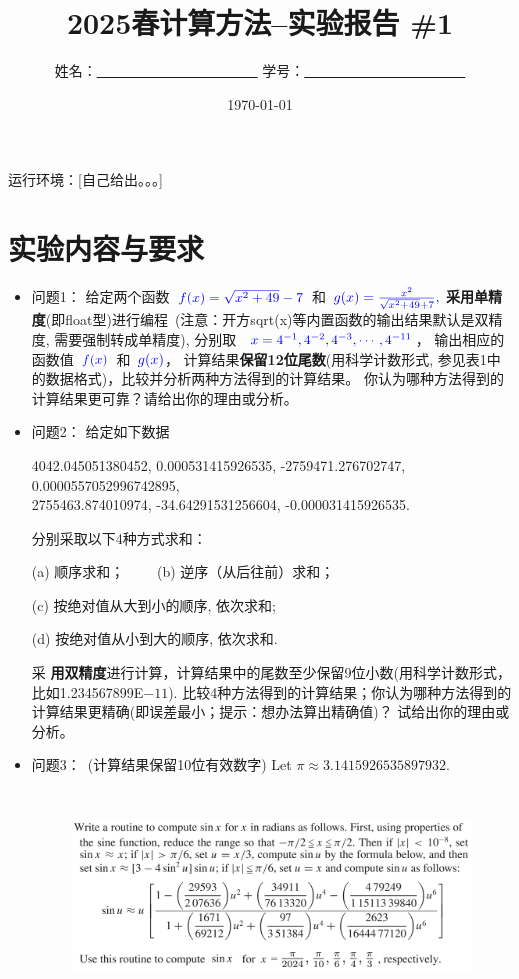 \documentclass[UTF8]{ctexart}
\title{\bf 2025春计算方法--实验报告 \#1}
\author{姓名：\underline{~~~~~~~~~~~~~~~~~~~~~~~}  学号：\underline{~~~~~~~~~~~~~~~~~~~~~~~} }
\date{\today}
\begin{document}
\maketitle

运行环境：[自己给出。。。]

\section*{实验内容与要求}
\begin{itemize}
  \item{问题1：}
  给定两个函数~$\color{blue}f(x)=\sqrt{x^2+49}-7$~和~$\color{blue}g(x)=\frac{x^2}{\sqrt{x^2+49}+7},$
{\bf\color{red} 采用单精度}(即float型)进行编程~(注意：开方sqrt(x)等内置函数的输出结果默认是双精度,
需要强制转成单精度), 分别取
~$\color{blue}x=4^{-1}, 4^{-2}, 4^{-3}, \cdots, 4^{-11}$，
输出相应的函数值~$\color{blue}f(x)$~和~$\color{blue}g(x)$，
计算结果{\bf 保留12位尾数}(用科学计数形式, 参见表1中的数据格式)，比较并分析两种方法得到的计算结果。
你认为哪种方法得到的计算结果更可靠？请给出你的理由或分析。

  \item{问题2：} 给定如下数据


4042.045051380452, 0.000531415926535, -2759471.276702747, 0.0000557052996742895, \\
2755463.874010974, -34.64291531256604,  -0.000031415926535.

分别采取以下4种方式求和：

(a) 顺序求和； ~~~~(b) 逆序（从后往前）求和；

(c) 按绝对值从大到小的顺序, 依次求和;

(d) 按绝对值从小到大的顺序, 依次求和.

采\textbf{\color{red}   用双精度}进行计算，计算结果中的尾数至少保留9位小数(用科学计数形式，比如1.234567899E$-11$).
比较4种方法得到的计算结果；你认为哪种方法得到的计算结果更精确(即误差最小；提示：想办法算出精确值)？
试给出你的理由或分析。


\item{问题3：~(计算结果保留10位有效数字)}  Let $\pi \approx 3.14159 26535 897932.$
\vspace{-0.1in}
\begin{figure}[htb]%
	\centering
        \includegraphics[width=5.40in,height=2.2in, angle=0]{image/lab01c}
\end{figure}


\end{itemize}
\end{document}
